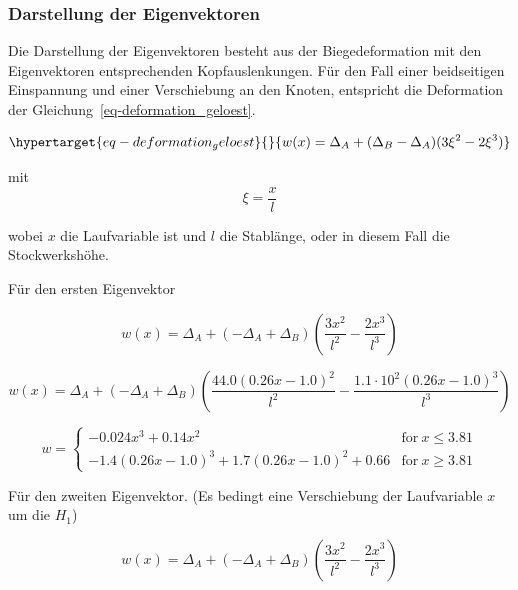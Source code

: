 \documentclass[
  letterpaper,
  DIV=11]{scrreprt}
\begin{document}
\hypertarget{darstellung-der-eigenvektoren}{%
\subsubsection{Darstellung der
Eigenvektoren}\label{darstellung-der-eigenvektoren}}

Die Darstellung der Eigenvektoren besteht aus der Biegedeformation mit
den Eigenvektoren entsprechenden Kopfauslenkungen. Für den Fall einer
beidseitigen Einspannung und einer Verschiebung an den Knoten,
entspricht die Deformation der Gleichung~\ref{eq-deformation_geloest}.

\begin{equation}\protect\hypertarget{eq-deformation_geloest}{}{
w(x) = \Delta_A + (\Delta_B- \Delta_A)(3\xi^2 - 2 \xi^3)
}\label{eq-deformation_geloest}\end{equation}

mit \[
\xi = \frac{x}{l}
\]

wobei \(x\) die Laufvariable ist und \(l\) die Stablänge, oder in diesem
Fall die Stockwerkshöhe.

Für den ersten Eigenvektor

\begin{equation}w{\left(x \right)} = \Delta_{A} + \left(- \Delta_{A} + \Delta_{B}\right) \left(\frac{3 x^{2}}{l^{2}} - \frac{2 x^{3}}{l^{3}}\right)\end{equation}

\begin{equation}w{\left(x \right)} = \Delta_{A} + \left(- \Delta_{A} + \Delta_{B}\right) \left(\frac{44.0 \left(0.26 x - 1.0\right)^{2}}{l^{2}} - \frac{1.1 \cdot 10^{2} \left(0.26 x - 1.0\right)^{3}}{l^{3}}\right)\end{equation}

\begin{equation}w = \begin{cases} - 0.024 x^{3} + 0.14 x^{2} & \text{for}\: x \leq 3.81 \\- 1.4 \left(0.26 x - 1.0\right)^{3} + 1.7 \left(0.26 x - 1.0\right)^{2} + 0.66 & \text{for}\: x \geq 3.81 \end{cases}\end{equation}

Für den zweiten Eigenvektor. (Es bedingt eine Verschiebung der
Laufvariable \(x\) um die \(H_1\))

\begin{equation}w{\left(x \right)} = \Delta_{A} + \left(- \Delta_{A} + \Delta_{B}\right) \left(\frac{3 x^{2}}{l^{2}} - \frac{2 x^{3}}{l^{3}}\right)\end{equation}
\end{document}
